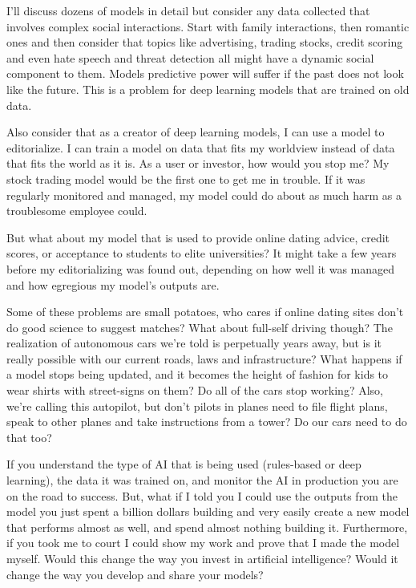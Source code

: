 I'll discuss dozens of models in detail but consider any data collected that involves complex social interactions. Start with family interactions, then romantic ones and then consider that topics like advertising, trading stocks, credit scoring and even hate speech and threat detection all might have a dynamic social component to them. Models predictive power will suffer if the past does not look like the future. This is a problem for deep learning models that are trained on old data.

Also consider that as a creator of deep learning models, I can use a model to editorialize. I can train a model on data that fits my worldview instead of data that fits the world as it is. As a user or investor, how would you stop me? My stock trading model would be the first one to get me in trouble. If it was regularly monitored and managed, my model could do about as much harm as a troublesome employee could. 

But what about my model that is used to provide online dating advice, credit scores, or acceptance to students to elite universities? It might take a few years before my editorializing was found out, depending on how well it was managed and how egregious my model's outputs are.

Some of these problems are small potatoes, who cares if online dating sites don't do good science to suggest matches? What about full-self driving though? The realization of autonomous cars we're told is perpetually years away, but is it really possible with our current roads, laws and infrastructure? What happens if a model stops being updated, and it becomes the height of fashion for kids to wear shirts with street-signs on them? Do all of the cars stop working? Also, we're calling this autopilot, but don't pilots in planes need to file flight plans, speak to other planes and take instructions from a tower? Do our cars need to do that too? 

If you understand the type of AI that is being used (rules-based or deep learning), the data it was trained on, and monitor the AI in production you are on the road to success. But, what if I told you I could use the outputs from the model you just spent a billion dollars building and very easily create a new model that performs almost as well, and spend almost nothing building it. Furthermore, if you took me to court I could show my work and prove that I made the model myself. Would this change the way you invest in artificial intelligence? Would it change the way you develop and share your models?

